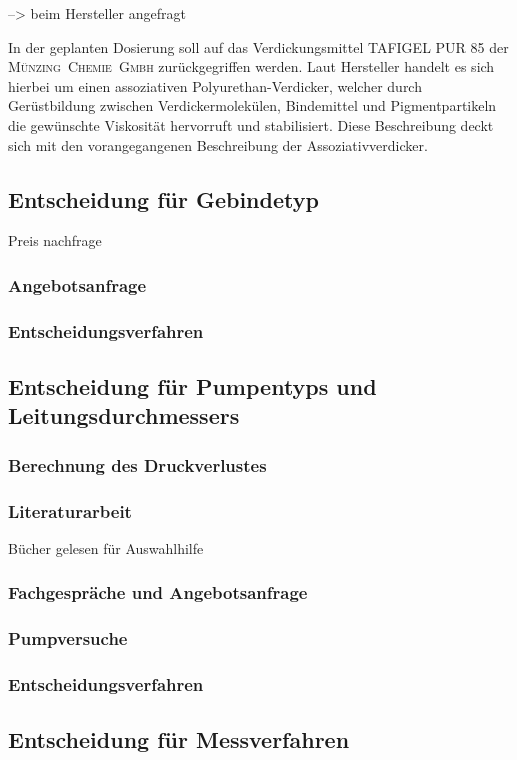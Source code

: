 --> beim Hersteller angefragt

In der geplanten Dosierung soll auf das Verdickungsmittel TAFIGEL PUR 85 der \mbox{\textsc{Münzing Chemie Gmbh}} zurückgegriffen werden. Laut Hersteller handelt es sich hierbei um einen assoziativen Polyurethan-Verdicker, welcher durch Gerüstbildung zwischen Verdickermolekülen, Bindemittel und Pigmentpartikeln die gewünschte Viskosität hervorruft und stabilisiert. Diese Beschreibung deckt sich mit den vorangegangenen Beschreibung der Assoziativverdicker.\cite{MunzingChemieGmbH.2014}\\


\subsection{Entscheidung für Gebindetyp}
Preis nachfrage
\subsubsection{Angebotsanfrage}
\subsubsection{Entscheidungsverfahren}

\subsection{Entscheidung für Pumpentyps und Leitungsdurchmessers}
\subsubsection{Berechnung des Druckverlustes}
\subsubsection{Literaturarbeit}
Bücher gelesen für Auswahlhilfe
\subsubsection{Fachgespräche und Angebotsanfrage}
\subsubsection{Pumpversuche}
\subsubsection{Entscheidungsverfahren}

\subsection{Entscheidung für Messverfahren}
